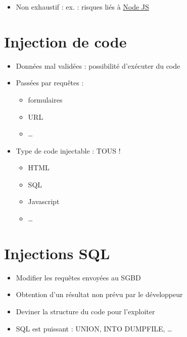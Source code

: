 \begin{itemize}
\tightlist
\item
  Non exhaustif : ex. : risques liés à
  \href{https://cheatsheetseries.owasp.org/cheatsheets/NPM_Security_Cheat_Sheet.html}{Node
  JS}
\end{itemize}

\hypertarget{injection-de-code}{%
\section{Injection de code}\label{injection-de-code}}

\begin{itemize}
\tightlist
\item
  Données mal validées : possibilité d'exécuter du code
\item
  Passées par requêtes :

  \begin{itemize}
  \tightlist
  \item
    formulaires
  \item
    URL
  \item
    \ldots{}
  \end{itemize}
\item
  Type de code injectable : TOUS !

  \begin{itemize}
  \tightlist
  \item
    HTML
  \item
    SQL
  \item
    Javascript
  \item
    \ldots{}
  \end{itemize}
\end{itemize}

\hypertarget{injections-sql}{%
\section{Injections SQL}\label{injections-sql}}

\begin{itemize}
\tightlist
\item
  Modifier les requêtes envoyées au SGBD
\item
  Obtention d'un résultat non prévu par le développeur
\item
  Deviner la structure du code pour l'exploiter
\item
  SQL est puissant : UNION, INTO DUMPFILE, \ldots{}
\end{itemize}

